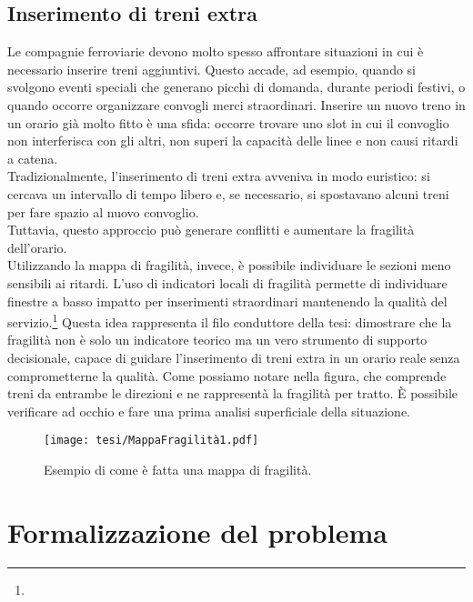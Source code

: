 \documentclass{report}
\newcommand{\fnShort}[2][]{\footnote{\footshorthand[#1]{#2}}}
\begin{document}
\section{Inserimento di treni extra}
Le compagnie ferroviarie devono molto spesso affrontare situazioni in cui è necessario inserire treni aggiuntivi. Questo accade, ad esempio, quando si svolgono eventi speciali che generano picchi di domanda, durante periodi festivi, o quando occorre organizzare convogli merci straordinari. Inserire un nuovo treno in un orario già molto fitto è una sfida: occorre trovare uno slot in cui il convoglio non interferisca con gli altri, non superi la capacità delle linee e non causi ritardi a catena. \\ Tradizionalmente, l’inserimento di treni extra avveniva in modo euristico: si cercava un intervallo di tempo libero e, se necessario, si spostavano alcuni treni per fare spazio al nuovo convoglio. \\ Tuttavia, questo approccio può generare conflitti e aumentare la fragilità dell’orario. \\ Utilizzando la mappa di fragilità, invece, è possibile individuare le sezioni meno sensibili ai ritardi.
L’uso di indicatori locali di fragilità permette di individuare finestre a basso impatto per inserimenti straordinari mantenendo la qualità del servizio.\fnShort{Omega2025}
Questa idea rappresenta il filo conduttore della tesi: dimostrare che la fragilità non è solo un indicatore teorico ma un vero strumento di supporto decisionale, capace di guidare l’inserimento di treni extra in un orario reale senza comprometterne la qualità.
Come possiamo notare nella figura, che comprende treni da entrambe le direzioni e ne rappresentà la fragilità per tratto. È possibile verificare ad occhio e fare una prima analisi superficiale della situazione.
\begin{figure}[H]  %
  \centering
  \texttt{[image: tesi/MappaFragilità1.pdf]}
  \caption{Esempio di come è fatta una mappa di fragilità.}
  \label{fig:placeholder}
\end{figure}



\chapter{Formalizzazione del problema}
\end{document}
